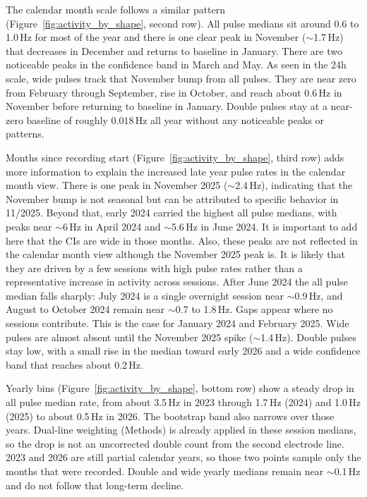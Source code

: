 The calendar month scale follows a similar pattern (Figure~\ref{fig:activity_by_shape}, second row).
All pulse medians sit around 0.6 to 1.0\,Hz for most of the year and there is one clear peak in November ($\sim$1.7\,Hz) that decreases in December and returns to baseline in January. 
There are two noticeable peaks in the confidence band in March and May.
As seen in the 24h scale, wide pulses track that November bump from all pulses. 
They are near zero from February through September, rise in October, and reach about 0.6\,Hz in November before returning to baseline in January.
Double pulses stay at a near-zero baseline of roughly $0.018$\,Hz all year without any noticeable peaks or patterns.

Months since recording start (Figure~\ref{fig:activity_by_shape}, third row) adds more information to explain the increased late year pulse rates in the calendar month view.
There is one peak in November 2025 ($\sim$2.4\,Hz), indicating that the November bump is not seasonal but can be attributed to specific behavior in 11/2025. 
Beyond that, early 2024 carried the highest all pulse medians, with peaks near $\sim$6\,Hz in April 2024 and $\sim$5.6\,Hz in June 2024.
It is important to add here that the CIs are wide in those months. 
Also, these peaks are not reflected in the calendar month view although the November 2025 peak is. 
It is likely that they are driven by a few sessions with high pulse rates rather than a representative increase in activity across sessions.
After June 2024 the all pulse median falls sharply: July 2024 is a single overnight session near $\sim$0.9\,Hz, and August to October 2024 remain near $\sim$0.7 to 1.8\,Hz.
Gaps appear where no sessions contribute. 
This is the case for January 2024 and February 2025.
Wide pulses are almost absent until the November 2025 spike ($\sim$1.4\,Hz). 
Double pulses stay low, with a small rise in the median toward early 2026 and a wide confidence band that reaches about 0.2\,Hz. 

Yearly bins (Figure~\ref{fig:activity_by_shape}, bottom row) show a steady drop in all pulse median rate, from about 3.5\,Hz in 2023 through 1.7\,Hz (2024) and 1.0\,Hz (2025) to about 0.5\,Hz in 2026.
The bootstrap band also narrows over those years.
Dual-line weighting (Methods) is already applied in these session medians, so the drop is not an uncorrected double count from the second electrode line.
2023 and 2026 are still partial calendar years, so those two points sample only the months that were recorded.
Double and wide yearly medians remain near $\sim$0.1\,Hz and do not follow that long-term decline. 

